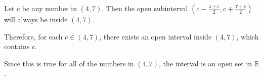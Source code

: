 \documentclass{ximera}
\begin{document}
\begin{example}
\begin{image}
  \end{image}






Let $c$ be any number in $(4,7)$.  Then the open subinterval $\left( c - \frac{4+c}{2}, c + \frac{7+c}{2} \right)$ will always be inside $(4,7)$.

Therefore, for each $c \in (4, 7)$, there exists an open interval inside $(4,7)$, which contains $c$.

Since this is true for all of the numbers in $(4,7)$, the interval is an open set in $\mathbb{R}$.


\end{example}







\newpage
\end{document}
